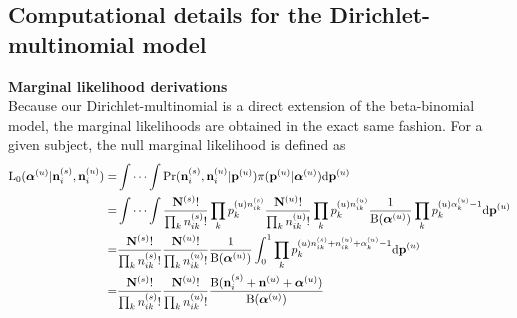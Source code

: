 \documentclass{article}
\begin{document}
\subsection{Computational details for the Dirichlet-multinomial model}
\noindent\textbf{Marginal likelihood derivations}\\
Because our Dirichlet-multinomial is a direct extension of the beta-binomial model, the marginal likelihoods are obtained in the exact same fashion.
For a given subject, the null marginal likelihood is defined as
\[
\begin{split}
\mathrm{L_0}(\boldsymbol{\alpha}^{(u)}|\mathbf{n}^{(s)}_{i},\mathbf{n}^{(u)}_{i})=&\idotsint\mathrm{Pr}(\mathbf{n}^{(s)}_{i},\mathbf{n}^{(u)}_{i}|\mathbf{p}^{(u)})\pi(\mathbf{p}^{(u)}|\boldsymbol{\alpha}^{(u)})\mathrm{d}\mathbf{p}^{(u)}\\
=&\idotsint \frac{\mathbf{N}^{(s)}!}{\prod_k {n}^{(s)}_{ik}!}\prod_k p^{(u)n^{(s)}_{ik}}_{k} \frac{\mathbf{N}^{(u)}!}{\prod_k {n}^{(u)}_{ik}!}\prod_k p^{(u)n^{(u)}_{ik}}_{k}\frac{1}{\mathrm{B}(\boldsymbol{\alpha}^{(u)})}\prod_k p^{(u)\alpha^{(u)}_{k}-1}_{k}\mathrm{d}\mathbf{p}^{(u)}\\
=&\frac{\mathbf{N}^{(s)}!}{\prod_k {n}^{(s)}_{ik}!}\frac{\mathbf{N}^{(u)}!}{\prod_k {n}^{(u)}_{ik}!}\frac{1}{\mathrm{B}(\boldsymbol{\alpha}^{(u)})}\int_0^1 \prod_k p^{(u)n^{(s)}_{ik}+n^{(u)}_{ik}+\alpha^{(u)}_{k}-1}_{k}\mathrm{d}\mathbf{p}^{(u)}\\
=&\frac{\mathbf{N}^{(s)}!}{\prod_k {n}^{(s)}_{ik}!}\frac{\mathbf{N}^{(u)}!}{\prod_k {n}^{(u)}_{ik}!}\frac{\mathrm{B}(\mathbf{n}^{(s)}_{i}+\mathbf{n}^{(u)}+\boldsymbol{\alpha}^{(u)})}{\mathrm{B}(\boldsymbol{\alpha}^{(u)})}
\end{split}
\]
\end{document}
